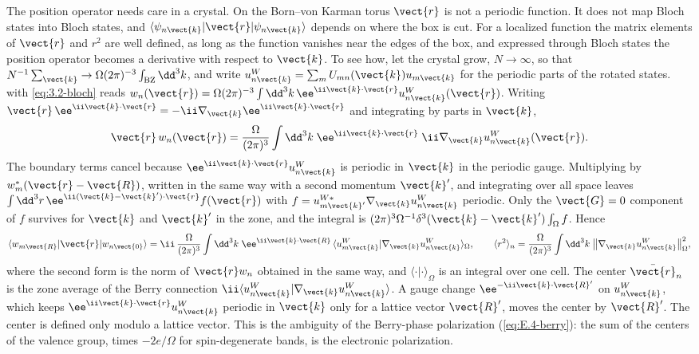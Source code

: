 The position operator needs care in a crystal. On the Born--von Karman torus $\vect{r}$ is not a periodic function. It does not map Bloch states into Bloch states, and $\langle\psi_{n\vect{k}}|\vect{r}|\psi_{n\vect{k}}\rangle$ depends on where the box is cut. For a localized function the matrix elements of $\vect{r}$ and $r^2$ are well defined, as long as the function vanishes near the edges of the box, and expressed through Bloch states the position operator becomes a derivative with respect to $\vect{k}$. To see how, let the crystal grow, $N\to\infty$, so that $N^{-1}\sum_{\vect{k}} \to \Omega(2\pi)^{-3}\int_{\mathrm{BZ}}\dd^3k$, and write $u^W_{n\vect{k}} = \sum_mU_{mn}(\vect{k})u_{m\vect{k}}$ for the periodic parts of the rotated states.  with \cref{eq:3.2-bloch} reads $w_n(\vect{r}) = \Omega(2\pi)^{-3}\int\dd^3k\,\ee^{\ii\vect{k}\cdot\vect{r}}u^W_{n\vect{k}}(\vect{r})$. Writing $\vect{r}\,\ee^{\ii\vect{k}\cdot\vect{r}} = -\ii\nabla_{\vect{k}}\ee^{\ii\vect{k}\cdot\vect{r}}$ and integrating by parts in $\vect{k}$,
\begin{equation*}
  \vect{r}\,w_n(\vect{r}) = \frac{\Omega}{(2\pi)^3}\int\dd^3k\;\ee^{\ii\vect{k}\cdot\vect{r}}\;\ii\nabla_{\vect{k}}u^W_{n\vect{k}}(\vect{r}) .
\end{equation*}
The boundary terms cancel because $\ee^{\ii\vect{k}\cdot\vect{r}}u^W_{n\vect{k}}$ is periodic in $\vect{k}$ in the periodic gauge. Multiplying by $w^*_m(\vect{r} - \vect{R})$, written in the same way with a second momentum $\vect{k}'$, and integrating over all space leaves $\int\dd^3r\,\ee^{\ii(\vect{k} - \vect{k}')\cdot\vect{r}}f(\vect{r})$ with $f = u^{W*}_{m\vect{k}'}\nabla_{\vect{k}}u^W_{n\vect{k}}$ periodic. Only the $\vect{G} = 0$ component of $f$ survives for $\vect{k}$ and $\vect{k}'$ in the zone, and the integral is $(2\pi)^3\Omega^{-1}\delta^3(\vect{k} - \vect{k}')\int_\Omega f$. Hence~\cite[Eqs.~(4) and (8)]{marzari1997maximally}
\begin{equation}
  \langle w_{m\vect{R}}|\vect{r}|w_{n\vect{0}}\rangle = \ii\,\frac{\Omega}{(2\pi)^3}\int\dd^3k\;\ee^{\ii\vect{k}\cdot\vect{R}}\,\langle u^W_{m\vect{k}}|\nabla_{\vect{k}}u^W_{n\vect{k}}\rangle_\Omega, \qquad
  \langle r^2\rangle_n = \frac{\Omega}{(2\pi)^3}\int\dd^3k\;\bigl\|\nabla_{\vect{k}}u^W_{n\vect{k}}\bigr\|_\Omega^2 ,
  \label{eq:3.6-blount}
\end{equation}
where the second form is the norm of $\vect{r}w_n$ obtained in the same way, and $\langle\cdot|\cdot\rangle_\Omega$ is an integral over one cell. The center $\bar{\vect{r}}_n$ is the zone average of the Berry connection $\ii\langle u^W_{n\vect{k}}|\nabla_{\vect{k}}u^W_{n\vect{k}}\rangle$. A gauge change $\ee^{-\ii\vect{k}\cdot\vect{R}'}$ on $u^W_{n\vect{k}}$, which keeps $\ee^{\ii\vect{k}\cdot\vect{r}}u^W_{n\vect{k}}$ periodic in $\vect{k}$ only for a lattice vector $\vect{R}'$, moves the center by $\vect{R}'$. The center is defined only modulo a lattice vector. This is the ambiguity of the Berry-phase polarization (\cref{eq:E.4-berry}): the sum of the centers of the valence group, times $-2e/\Omega$ for spin-degenerate bands, is the electronic polarization.

